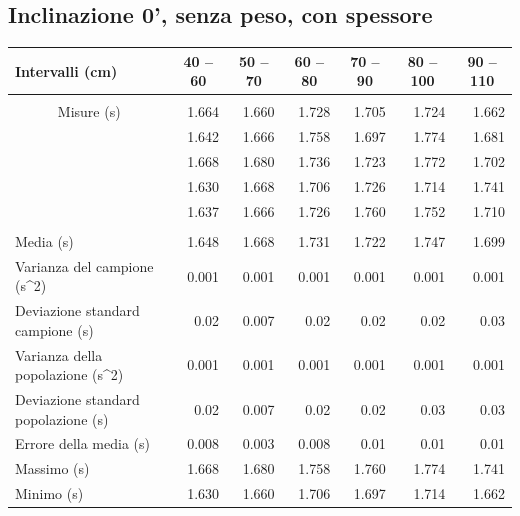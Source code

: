 \documentclass[12pt]{article} %
\begin{document}
	\subsection {Inclinazione 0', senza peso, con spessore}
		\begin{table}[H]
			\begin{tabular}{|l|r|r|r|r|r|r|}
			\hline
			Intervalli (cm) & \multicolumn{1}{c|}{40 – 60} & \multicolumn{1}{c|}{50 – 70} & \multicolumn{1}{c|}{60 – 80} & \multicolumn{1}{c|}{70 – 90} & \multicolumn{1}{c|}{80 – 100} & \multicolumn{1}{c|}{90 – 110} \\ \hline
			 & \multicolumn{ 6}{l|}{} \\ \hline
			\multicolumn{ 1}{|c|}{Misure (s)} & 1.664 & 1.660 & 1.728 & 1.705 & 1.724 & 1.662 \\ \cline{ 2- 7}
			\multicolumn{ 1}{|l|}{} & 1.642 & 1.666 & 1.758 & 1.697 & 1.774 & 1.681 \\ \cline{ 2- 7}
			\multicolumn{ 1}{|l|}{} & 1.668 & 1.680 & 1.736 & 1.723 & 1.772 & 1.702 \\ \cline{ 2- 7}
			\multicolumn{ 1}{|l|}{} & 1.630 & 1.668 & 1.706 & 1.726 & 1.714 & 1.741 \\ \cline{ 2- 7}
			\multicolumn{ 1}{|l|}{} & 1.637 & 1.666 & 1.726 & 1.760 & 1.752 & 1.710 \\ \hline
			 & \multicolumn{ 6}{c|}{} \\ \hline
			Media (s) & 1.648 & 1.668 & 1.731 & 1.722 & 1.747 & 1.699 \\ \hline
			Varianza del campione (s^2) & 0.001 & 0.001 & 0.001 & 0.001 & 0.001 & 0.001 \\ \hline
			Deviazione standard campione (s) & 0.02 & 0.007 & 0.02 & 0.02 & 0.02 & 0.03 \\ \hline
			Varianza della popolazione (s^2) & 0.001 & 0.001 & 0.001 & 0.001 & 0.001 & 0.001 \\ \hline
			Deviazione standard popolazione (s) & 0.02 & 0.007 & 0.02 & 0.02 & 0.03 & 0.03 \\ \hline
			Errore della media (s) & 0.008 & 0.003 & 0.008 & 0.01 & 0.01 & 0.01 \\ \hline
			Massimo (s) & 1.668 & 1.680 & 1.758 & 1.760 & 1.774 & 1.741 \\ \hline
			Minimo (s) & 1.630 & 1.660 & 1.706 & 1.697 & 1.714 & 1.662 \\ \hline
			\end{tabular}

		\label{0a}
		\end{table}
	
\end{document}
